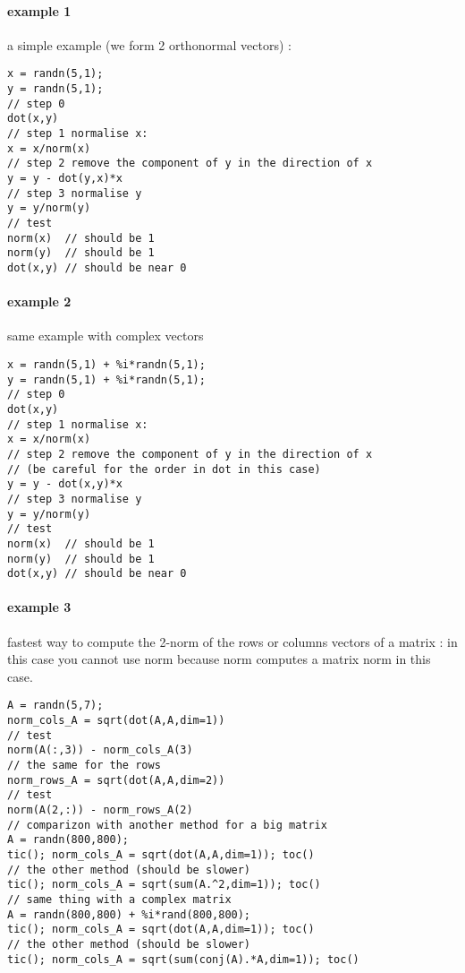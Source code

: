 \begin{examples}
\paragraph{example 1} a simple example (we form 2 orthonormal vectors) :
\begin{Verbatim}
x = randn(5,1);
y = randn(5,1);
// step 0
dot(x,y)
// step 1 normalise x:
x = x/norm(x)
// step 2 remove the component of y in the direction of x
y = y - dot(y,x)*x
// step 3 normalise y
y = y/norm(y)
// test 
norm(x)  // should be 1
norm(y)  // should be 1
dot(x,y) // should be near 0
\end{Verbatim}

\paragraph{example 2} same example with complex vectors
\begin{Verbatim}
x = randn(5,1) + %i*randn(5,1);
y = randn(5,1) + %i*randn(5,1);
// step 0
dot(x,y)
// step 1 normalise x:
x = x/norm(x)
// step 2 remove the component of y in the direction of x
// (be careful for the order in dot in this case)
y = y - dot(x,y)*x
// step 3 normalise y
y = y/norm(y)
// test 
norm(x)  // should be 1
norm(y)  // should be 1
dot(x,y) // should be near 0
\end{Verbatim}

\paragraph{example 3} fastest way to compute the 2-norm of the rows or
 columns vectors of a matrix : in this case you cannot use norm because
 norm computes a matrix norm in this case.
\begin{Verbatim}
A = randn(5,7);
norm_cols_A = sqrt(dot(A,A,dim=1))
// test
norm(A(:,3)) - norm_cols_A(3)
// the same for the rows
norm_rows_A = sqrt(dot(A,A,dim=2))
// test
norm(A(2,:)) - norm_rows_A(2)
// comparizon with another method for a big matrix
A = randn(800,800);
tic(); norm_cols_A = sqrt(dot(A,A,dim=1)); toc()
// the other method (should be slower)
tic(); norm_cols_A = sqrt(sum(A.^2,dim=1)); toc()
// same thing with a complex matrix
A = randn(800,800) + %i*rand(800,800);
tic(); norm_cols_A = sqrt(dot(A,A,dim=1)); toc()
// the other method (should be slower)
tic(); norm_cols_A = sqrt(sum(conj(A).*A,dim=1)); toc()
\end{Verbatim}
\end{examples}

\begin{manseealso}
     
\end{manseealso}

